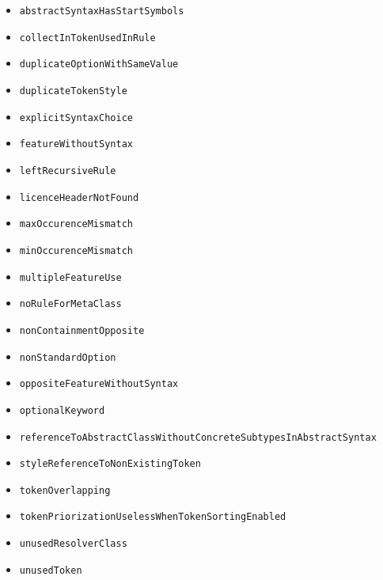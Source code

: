 \begin{itemize}
\item \texttt{abstractSyntaxHasStartSymbols}
\item \texttt{collectInTokenUsedInRule}
\item \texttt{duplicateOptionWithSameValue}
\item \texttt{duplicateTokenStyle}
\item \texttt{explicitSyntaxChoice}
\item \texttt{featureWithoutSyntax}
\item \texttt{leftRecursiveRule}
\item \texttt{licenceHeaderNotFound}
\item \texttt{maxOccurenceMismatch}
\item \texttt{minOccurenceMismatch}
\item \texttt{multipleFeatureUse}
\item \texttt{noRuleForMetaClass}
\item \texttt{nonContainmentOpposite}
\item \texttt{nonStandardOption}
\item \texttt{oppositeFeatureWithoutSyntax}
\item \texttt{optionalKeyword}
\item \texttt{referenceToAbstractClassWithoutConcreteSubtypesInAbstractSyntax}
\item \texttt{styleReferenceToNonExistingToken}
\item \texttt{tokenOverlapping}
\item \texttt{tokenPriorizationUselessWhenTokenSortingEnabled}
\item \texttt{unusedResolverClass}
\item \texttt{unusedToken}
\end{itemize}
